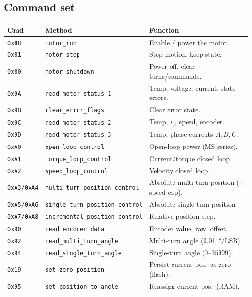 \documentclass[11pt,a4paper]{article}
\newcommand{\code}[1]{\texttt{#1}}
\begin{document}
\subsection{Command set}
\begin{center}
\begin{tabular}{@{}llp{8.2cm}@{}}
\toprule
\textbf{Cmd} & \textbf{Method} & \textbf{Function} \\
\midrule
\texttt{0x88} & \code{motor\_run}                 & Enable / power the motor.\\
\texttt{0x81} & \code{motor\_stop}                & Stop motion, keep state.\\
\texttt{0x80} & \code{motor\_shutdown}            & Power off, clear turns/commands.\\
\texttt{0x9A} & \code{read\_motor\_status\_1}     & Temp, voltage, current, state, errors.\\
\texttt{0x9B} & \code{clear\_error\_flags}        & Clear error state.\\
\texttt{0x9C} & \code{read\_motor\_status\_2}     & Temp, $i_q$, speed, encoder.\\
\texttt{0x9D} & \code{read\_motor\_status\_3}     & Temp, phase currents $A,B,C$.\\
\texttt{0xA0} & \code{open\_loop\_control}        & Open-loop power (MS series).\\
\texttt{0xA1} & \code{torque\_loop\_control}      & Current/torque closed loop.\\
\texttt{0xA2} & \code{speed\_loop\_control}       & Velocity closed loop.\\
\texttt{0xA3/0xA4} & \code{multi\_turn\_position\_control} & Absolute multi-turn position ($\pm$ speed cap).\\
\texttt{0xA5/0xA6} & \code{single\_turn\_position\_control}& Absolute single-turn position.\\
\texttt{0xA7/0xA8} & \code{incremental\_position\_control} & Relative position step.\\
\texttt{0x90} & \code{read\_encoder\_data}        & Encoder value, raw, offset.\\
\texttt{0x92} & \code{read\_multi\_turn\_angle}   & Multi-turn angle (\SI{0.01}{\degree}/LSB).\\
\texttt{0x94} & \code{read\_single\_turn\_angle}  & Single-turn angle ($0$--$35999$).\\
\texttt{0x19} & \code{set\_zero\_position}        & Persist current pos.\ as zero (flash).\\
\texttt{0x95} & \code{set\_position\_to\_angle}   & Reassign current pos.\ (RAM).\\
\bottomrule
\end{tabular}
\end{center}
\end{document}
